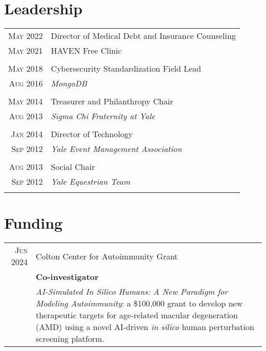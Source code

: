\documentclass[a4paper,10pt]{article}
\begin{document}
\section{Leadership}
\begin{longtable}{r|p{11cm}}
 \nopagebreak \textsc{May 2022} & Director of Medical Debt and Insurance Counseling\\
 \nopagebreak \textsc{May 2021} &  \small{HAVEN Free Clinic}\\
 \multicolumn{2}{c}{} \\
 \nopagebreak \textsc{May 2018} & Cybersecurity Standardization Field Lead \\
 \nopagebreak \textsc{Aug 2016} & \small\emph{MongoDB} \\
 \multicolumn{2}{c}{} \\
 \nopagebreak \textsc{May 2014} & Treasurer and Philanthropy Chair \\
 \nopagebreak \textsc{Aug 2013} & \small\emph{Sigma Chi Fraternity at Yale} \\
 \multicolumn{2}{c}{} \\
 \nopagebreak \textsc{Jan 2014} & Director of Technology \\
 \nopagebreak \textsc{Sep 2012} & \small\emph{Yale Event Management Association} \\
 \multicolumn{2}{c}{} \\
 \nopagebreak \textsc{Aug 2013} & Social Chair \\
 \nopagebreak \textsc{Sep 2012} & \small\emph{Yale Equestrian Team} \\
 \multicolumn{2}{c}{} \\
\end{longtable}


\section{Funding}
\begin{tabular}{rp{11cm}}
\textsc{Jun} 2024 & Colton Center for Autoimmunity Grant \\
 							    & \textbf{Co-investigator} \\
								& \textit{AI-Simulated In Silico Humans: A New Paradigm for Modeling Autoimmunity}: a \$100,000 grant to develop new therapeutic targets for age-related macular degeneration (AMD) using a novel AI-driven \textit{in silico} human perturbation screening platform.
\end{tabular}
\end{document}
